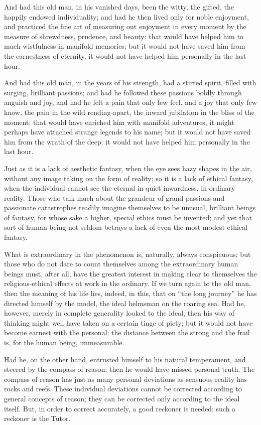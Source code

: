 \documentclass[12pt,a4paper]{book}
\begin{document}
And had this old man, in his vanished days, been the witty, the gifted, the happily endowed individuality; and had he then lived only for noble enjoyment, and practiced the fine art of measuring out enjoyment in every moment by the measure of shrewdness, prudence, and beauty: that would have helped him to much wistfulness in manifold memories; but it would not have saved him from the earnestness of eternity, it would not have helped him personally in the last hour.

And had this old man, in the years of his strength, had a stirred spirit, filled with surging, brilliant passions; and had he followed these passions boldly through anguish and joy, and had he felt a pain that only few feel, and a joy that only few know, the pain in the wild rending-apart, the inward jubilation in the bliss of the moment: that would have enriched him with manifold adventures, it might perhaps have attached strange legends to his name; but it would not have saved him from the wrath of the deep: it would not have helped him personally in the last hour.

Just as it is a lack of aesthetic fantasy, when the eye sees hazy shapes in the air, without any image taking on the form of reality; so it is a lack of ethical fantasy, when the individual cannot see the eternal in quiet inwardness, in ordinary reality. Those who talk much about the grandeur of grand passions and passionate catastrophes readily imagine themselves to be unusual, brilliant beings of fantasy, for whose sake a higher, special ethics must be invented; and yet that sort of human being not seldom betrays a lack of even the most modest ethical fantasy.

What is extraordinary in the phenomenon is, naturally, always conspicuous; but those who do not dare to count themselves among the extraordinary human beings must, after all, have the greatest interest in making clear to themselves the religious-ethical effects at work in the ordinary.
If we turn again to the old man, then the meaning of his life lies, indeed, in this, that on ``the long journey'' he has directed himself by the model, the ideal helmsman on the roaring sea. Had he, however, merely in complete generality looked to the ideal, then his way of thinking might well have taken on a certain tinge of piety; but it would not have become earnest with the personal: the distance between the strong and the frail is, for the human being, immeasurable.

Had he, on the other hand, entrusted himself to his natural temperament, and steered by the compass of reason; then he would have missed personal truth. The compass of reason has just as many personal deviations as sensuous reality has rocks and reefs. These individual deviations cannot be corrected according to general concepts of reason; they can be corrected only according to the ideal itself. But, in order to correct accurately, a good reckoner is needed: such a reckoner is the Tutor.
\end{document}
